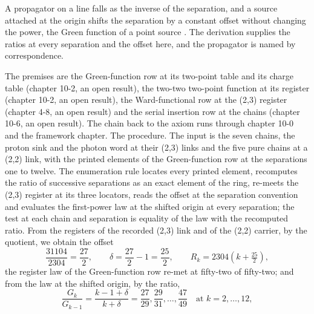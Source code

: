 \begin{chbridge}
A propagator on a line falls as the inverse of the separation, and a source attached at the origin shifts the separation by a constant offset without changing the power, the Green function of a point source \cite{Feynman1949,Schwinger1951}. The derivation supplies the ratios at every separation and the offset here, and the propagator is named by correspondence.
\end{chbridge}
\begin{chproof}
The premises are the Green-function row at its two-point table and its charge table (chapter 10-2, an open result), the two-two two-point function at its register (chapter 10-2, an open result), the Ward-functional row at the (2,3) register (chapter 4-8, an open result) and the serial insertion row at the chains (chapter 10-6, an open result). The chain back to the axiom runs through chapter 10-0 and the framework chapter. The procedure. The input is the seven chains, the proton sink and the photon word at their (2,3) links and the five pure chains at a (2,2) link, with the printed elements of the Green-function row at the separations one to twelve. The enumeration rule locates every printed element, recomputes the ratio of successive separations as an exact element of the ring, re-meets the (2,3) register at its three locators, reads the offset at the separation convention and evaluates the first-power law at the shifted origin at every separation; the test at each chain and separation is equality of the law with the recomputed ratio. From the registers of the recorded (2,3) link and of the (2,2) carrier, by the quotient, we obtain the offset
\begin{equation}
\frac{31104}{2304} = \frac{27}{2} , \qquad \delta = \frac{27}{2} - 1 = \frac{25}{2} , \qquad R_{k} = 2304 \left( k + \tfrac{25}{2} \right) ,
\end{equation}
the register law of the Green-function row re-met at fifty-two of fifty-two; and from the law at the shifted origin, by the ratio,
\begin{equation}
\frac{G_{k}}{G_{k-1}} = \frac{k - 1 + \delta}{k + \delta} = \frac{27}{29}, \frac{29}{31}, \ldots, \frac{47}{49} \quad \text{at } k = 2, \ldots, 12 ,
\end{equation}

\end{chproof}
